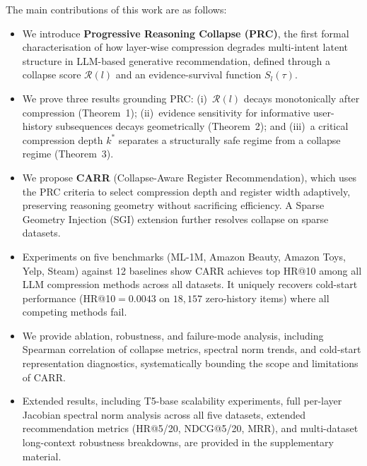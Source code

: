 \documentclass[lettersize,journal]{IEEEtran}
\begin{document}
\IEEEpubidadjcol

The main contributions of this work are as follows:
\begin{itemize}
    \item We introduce \textbf{Progressive Reasoning Collapse (PRC)}, the first formal characterisation of how layer-wise compression degrades multi-intent latent structure in LLM-based generative recommendation, defined through a collapse score $\mathcal{R}(l)$ and an evidence-survival function $S_l(\tau)$.

    \item We prove three results grounding PRC: (i)~$\mathcal{R}(l)$ decays monotonically after compression (Theorem~1); (ii)~evidence sensitivity for informative user-history subsequences decays geometrically (Theorem~2); and (iii)~a critical compression depth $k^*$ separates a structurally safe regime from a collapse regime (Theorem~3).

    \item We propose \textbf{CARR} (Collapse-Aware Register Recommendation), which uses the PRC criteria to select compression depth and register width adaptively, preserving reasoning geometry without sacrificing efficiency. A Sparse Geometry Injection (SGI) extension further resolves collapse on sparse datasets.

    \item Experiments on five benchmarks (ML-1M, Amazon Beauty, Amazon Toys, Yelp, Steam) against 12 baselines show CARR achieves top HR@10 among all LLM compression methods across all datasets. It uniquely recovers cold-start performance (HR@10$=0.0043$ on $18{,}157$ zero-history items) where all competing methods fail.

    \item We provide ablation, robustness, and failure-mode analysis, including Spearman correlation of collapse metrics, spectral norm trends, and cold-start representation diagnostics, systematically bounding the scope and limitations of CARR.

    \item Extended results, including T5-base scalability experiments, full per-layer Jacobian spectral norm analysis across all five datasets, extended recommendation metrics (HR@5/20, NDCG@5/20, MRR), and multi-dataset long-context robustness breakdowns, are provided in the supplementary material.
\end{itemize}
\end{document}
